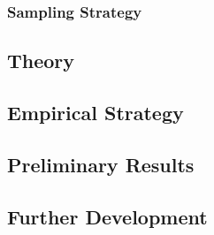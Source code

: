 \documentclass[11pt]{article}
\begin{document}
\subsubsection{Sampling Strategy} \label{subsec:sampling_paper3}



\subsection{Theory} \label{subsec:theory_paper3}

\subsection{Empirical Strategy} \label{subsec:methods_paper3}

\subsection{Preliminary Results} \label{subsec:results_paper3}







\subsection{Further Development} \label{subsec:conclusion_paper3}

\clearpage

\setlength\bibsep{0pt}


\end{document}
